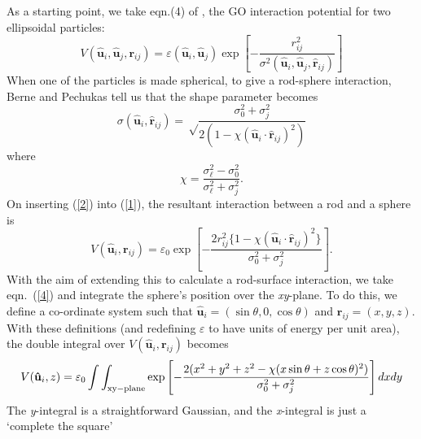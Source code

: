 \documentclass[aps,10pt,twocolumn]{revtex4}
\newcommand{\vect}[1]{ \mathbf{#1} }
\newcommand{\vecth}[1]{ \mathbf{\hat{#1} } }
\newcommand{\rij}{\vecth{r}_{ij}}
\newcommand{\ui}{\vecth{u}_i}
\newcommand{\uj}{\vecth{u}_j}
\newcommand{\ijr}{\ui,\uj,\rij}
\begin{document}
As a starting point, we take eqn.(4) of \cite{BernePechukas72}, the GO interaction potential for two ellipsoidal
particles:
\begin{equation}
\label{1}
 V(\ui,\uj,\vect{r}_{ij})= \varepsilon(\ui,\uj) \exp \left[ - \frac{r_{ij}^2} {\sigma^2(\ijr)} \right]
\end{equation}
When one of the particles is made spherical, to give a rod-sphere interaction, Berne and Pechukas tell us that the
shape parameter becomes
\begin{equation}
\label{2} \sigma(\ui,\rij)= \sqrt  \frac{\sigma_{0}^2+\sigma_{j}^2} {2(1-\chi(\ui \cdot \rij)^2)}
\end{equation}
where
\begin{equation}
\label{3}
 \chi=\frac{\sigma_{\ell}^2-\sigma_{0}^2}{\sigma_{\ell}^2+\sigma_{j}^2}.
\end{equation}
On inserting (\ref{2}) into (\ref{1}), the resultant interaction between a rod and a sphere is
\begin{equation}
\label{4}
 V(\ui,\vect{r}_{ij})= \varepsilon_0 \exp \left[ - \frac{2r_{ij}^2\{1-\chi (\ui \cdot \rij)^2\}} {\sigma_{0}^2+\sigma_{j}^2}
 \right] .
\end{equation}
With the aim of extending this to calculate a rod-surface interaction, we take eqn.~(\ref{4}) and integrate the
sphere's position over the \textit{xy}-plane. To do this, we define a co-ordinate system such that
$\ui=(\sin\theta,0,\cos\theta)$ and $\vect{r}_{ij}=(x,y,z)$. With these definitions (and redefining $\varepsilon$
to have units of energy per unit area), the double integral over $V(\ui,\vect{r}_{ij})$ becomes
\begin{equation}
\label{5}
 V(\ui,z)=
  \varepsilon_0 \int \int_{\rm xy-plane}  \exp
 \left[ - \frac{2(x^2+y^2+z^2-\chi (x\sin\theta+z\cos\theta)^2)} {\sigma_{0}^2+\sigma_{j}^2} \right] dx dy
\end{equation}
The \textit{y}-integral is a straightforward Gaussian, and the \textit{x}-integral is just a `complete the square'
\end{document}
